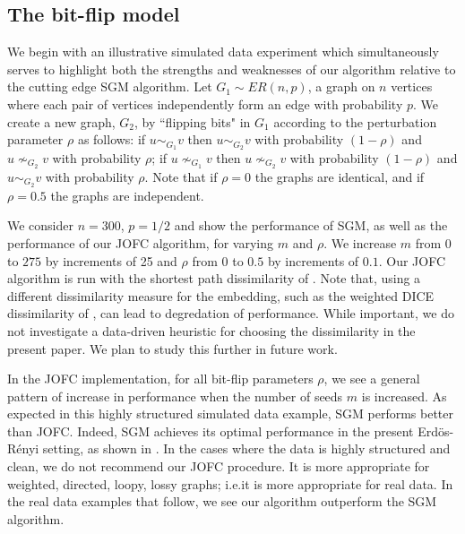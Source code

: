 \documentclass[12pt]{article}
\numberwithin{equation}{section}
\theoremstyle{definition}
\begin{document}
\subsection{The bit-flip model}
\label{S:bf}
We begin with an illustrative simulated data experiment which
simultaneously serves to highlight both the strengths and weaknesses of
our algorithm relative to the cutting edge SGM algorithm.  Let $G_1\sim
ER(n,p)$, a graph on $n$ vertices where each pair of vertices
independently form an edge with probability $p$.  We create a new graph,
$G_2$, by ``flipping bits" in $G_1$ according to the perturbation
parameter $\rho$ as follows: if $u\sim_{G_1}\!v$ then $u\sim_{G_2}\!v$
with probability $(1-\rho)$ and $u\nsim_{G_2}\!v$ with probability
$\rho$; if $u\nsim_{G_1}\!v$ then $u\nsim_{G_2}\!v$ with probability
$(1-\rho)$ and $u\sim_{G_2}\!v$ with probability $\rho$.  Note that if
$\rho=0$ the graphs are identical, and if $\rho=0.5$ the graphs are
independent.%

We consider $n=300$, $p=1/2$ and show the performance of SGM, as well as
the performance of our JOFC algorithm, for varying $m$ and
$\rho$.  We increase $m$ from $0$ to $275$ by increments of 25 and
$\rho$ from $0$ to $0.5$ by increments of $0.1$.  Our JOFC algorithm is
run with the shortest path dissimilarity of \cite{dis2}. 
Note that, using a different dissimilarity measure for the
embedding, such as the weighted DICE dissimilarity of \cite{dice}, can
lead to degredation of performance.
While important, we do not investigate a data-driven heuristic for choosing the
dissimilarity in the present paper. 
We plan to study this further in future work.

In the JOFC implementation, %
for all bit-flip parameters $\rho$, we see a general pattern of increase in
performance when the number of seeds $m$ is increased.  As expected in
this highly
structured simulated data example, SGM performs better than JOFC.
Indeed, SGM achieves its optimal performance in the present
Erd\"os-R\'enyi setting, as shown in \cite{sgm2}.  In the cases where
the data is highly structured and clean, we do not recommend our JOFC
procedure.  It is more appropriate for weighted, directed, loopy, lossy
graphs; i.e.\@ it is more appropriate for real data.  In the real data
examples that follow, we see our algorithm outperform the SGM algorithm.
\end{document}
